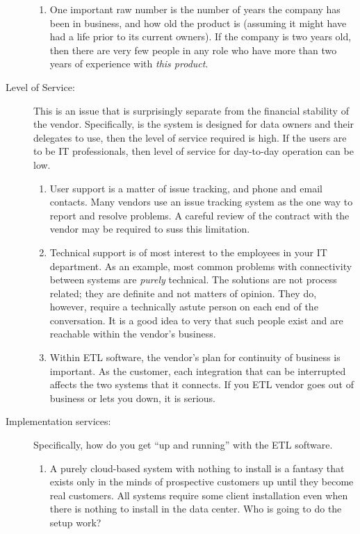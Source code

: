\documentclass[11pt,letterpaper,twosided]{memoir}
\begin{document}
\begin{description}
\begin{enumerate}
\item One important raw number is the number of years the company
has been in business, and how old the product is (assuming it might
have had a life prior to its current owners). If the company is 
two years old, then there are very few people in any role who have
more than two years of experience with \emph{this product}.

\end{enumerate}

\item[Level of Service:] This is an issue that is surprisingly
separate from the financial stability of the vendor. Specifically,
is the system is designed for data owners and their delegates to
use, then the level of service required is high. If the users are
to be IT professionals, then level of service for day-to-day operation
can be low.

\begin{enumerate}
\item User support is a matter of issue tracking, and phone and
email contacts. Many vendors use an issue tracking system as the
one way to report and resolve problems. A careful review of the
contract with the vendor may be required to suss this limitation.

\item Technical support is of most interest to the employees in
your IT department. As an example, most common problems with
connectivity between systems are \emph{purely} technical. The
solutions are not process related; they are definite and not matters
of opinion. They do, however, require a technically astute person
on each end of the conversation. It is a good idea to very that
such people exist and are reachable within the vendor's business.

\item Within ETL software, the vendor's plan for continuity of
business is important. As the customer, each integration that can
be interrupted affects the two systems that it connects.  If you
ETL vendor goes out of business or lets you down, it is serious.

\end{enumerate}


\item[Implementation services:] Specifically, how do you get ``up
and running'' with the ETL software.

\begin{enumerate}
\item A purely cloud-based system with nothing to install is 
a fantasy that exists only in the minds of prospective customers
up until they become real customers. All systems require some
client installation even when there is nothing to install in the
data center. Who is going to do the setup work?


\end{enumerate}
\end{description}
\end{document}
